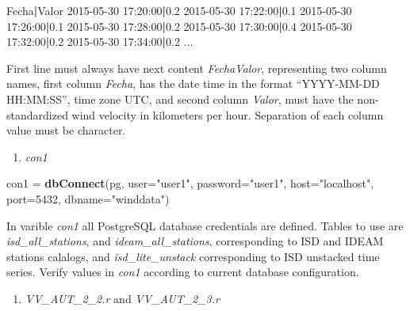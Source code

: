 \documentclass[12pt,oneside]{reedthesis}
\newenvironment{Shaded}{\begin{snugshade}}{\end{snugshade}}
\newcommand{\DataTypeTok}[1]{\textcolor[rgb]{0.13,0.29,0.53}{#1}}
\newcommand{\DecValTok}[1]{\textcolor[rgb]{0.00,0.00,0.81}{#1}}
\newcommand{\ExtensionTok}[1]{#1}
\newcommand{\KeywordTok}[1]{\textcolor[rgb]{0.13,0.29,0.53}{\textbf{#1}}}
\newcommand{\NormalTok}[1]{#1}
\newcommand{\StringTok}[1]{\textcolor[rgb]{0.31,0.60,0.02}{#1}}
\providecommand{\tightlist}{%
  \setlength{\itemsep}{0pt}\setlength{\parskip}{0pt}}
\begin{document}
\vspace{0.4cm}
\begin{Shaded}
\begin{Highlighting}[]
      \ExtensionTok{Fecha}\KeywordTok{|}\ExtensionTok{Valor}
      \ExtensionTok{2015-05-30}\NormalTok{ 17:20:00}\KeywordTok{|}\ExtensionTok{0.2}
      \ExtensionTok{2015-05-30}\NormalTok{ 17:22:00}\KeywordTok{|}\ExtensionTok{0.1}
      \ExtensionTok{2015-05-30}\NormalTok{ 17:26:00}\KeywordTok{|}\ExtensionTok{0.1}
      \ExtensionTok{2015-05-30}\NormalTok{ 17:28:00}\KeywordTok{|}\ExtensionTok{0.2}
      \ExtensionTok{2015-05-30}\NormalTok{ 17:30:00}\KeywordTok{|}\ExtensionTok{0.4}
      \ExtensionTok{2015-05-30}\NormalTok{ 17:32:00}\KeywordTok{|}\ExtensionTok{0.2}
      \ExtensionTok{2015-05-30}\NormalTok{ 17:34:00}\KeywordTok{|}\ExtensionTok{0.2}
      \ExtensionTok{...}
\end{Highlighting}
\end{Shaded}
\normalsize

First line must always have next content \emph{Fecha\textbar Valor}, representing two column names, first column \emph{Fecha}, has the date time in the format ``YYYY-MM-DD HH:MM:SS'', time zone UTC, and second column \emph{Valor}, must have the non-standardized wind velocity in kilometers per hour. Separation of each column value must be \emph{\textbar{}} character.
\begin{enumerate}
\def\labelenumi{\arabic{enumi}.}
\setcounter{enumi}{2}
\tightlist
\item
  \emph{con1}
\end{enumerate}
\scriptsize

\vspace{0.4cm}
\begin{Shaded}
\begin{Highlighting}[]
\NormalTok{      con1 =}\StringTok{ }\KeywordTok{dbConnect}\NormalTok{(pg, }\DataTypeTok{user=}\StringTok{"user1"}\NormalTok{, }\DataTypeTok{password=}\StringTok{"user1"}\NormalTok{, }\DataTypeTok{host=}\StringTok{"localhost"}\NormalTok{, }\DataTypeTok{port=}\DecValTok{5432}\NormalTok{, }\DataTypeTok{dbname=}\StringTok{"winddata"}\NormalTok{)}
\end{Highlighting}
\end{Shaded}
\normalsize

In varible \emph{con1} all PostgreSQL database credentials are defined. Tables to use are \emph{isd\_all\_stations}, and \emph{ideam\_all\_stations}, corresponding to ISD and IDEAM stations calalogs, and \emph{isd\_lite\_unstack} corresponding to ISD unstacked time series. Verify values in \emph{con1} according to current database configuration.
\begin{enumerate}
\def\labelenumi{\arabic{enumi}.}
\setcounter{enumi}{3}
\tightlist
\item
  \emph{VV\_AUT\_2\_2.r} and \emph{VV\_AUT\_2\_3.r}
\end{enumerate}
\scriptsize
\end{document}

